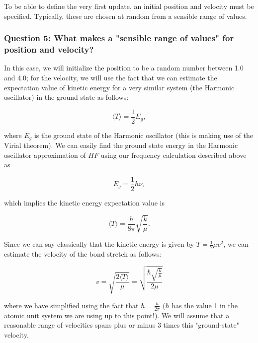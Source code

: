 \documentclass[11pt]{article}
\begin{document}
    To be able to define the very first update, an initial position and
velocity must be specified. Typically, these are chosen at random from a
sensible range of values.

\subsubsection{Question 5: What makes a "sensible range of values" for
position and
velocity?}\label{question-5-what-makes-a-sensible-range-of-values-for-position-and-velocity}

In this case, we will initialize the position to be a random number
between 1.0 and 4.0; for the velocity, we will use the fact that we can
estimate the expectation value of kinetic energy for a very similar
system (the Harmonic oscillator) in the ground state as follows:

\begin{equation}
\langle T \rangle = \frac{1}{2} E_g,
\end{equation}

where \(E_g\) is the ground state of the Harmonic oscillator (this is
making use of the Virial theorem). We can easily find the ground state
energy in the Harmonic oscillator approximation of \(HF\) using our
frequency calculation described above as

\begin{equation}
E_g = \frac{1}{2} h \nu,
\end{equation}

which implies the kinetic energy expectation value is

\begin{equation}
\langle T \rangle = \frac{h}{8 \pi} \sqrt{\frac{k}{\mu}}.
\end{equation}

Since we can say classically that the kinetic energy is given by
\(T = \frac{1}{2}\mu v^2\), we can estimate the velocity of the bond
stretch as follows:

\begin{equation}
v = \sqrt{\frac{2 \langle T \rangle}{\mu}} = \sqrt{ \frac{\hbar \sqrt{\frac{k}{\mu}}}{2\mu}}
\end{equation}

where we have simplified using the fact that \(\hbar = \frac{h}{2\pi}\)
(\(\hbar\) has the value 1 in the atomic unit system we are using up to
this point!). We will assume that a reasonable range of velocities spans
plus or minus 3 times this "ground-state" velocity.
\end{document}
